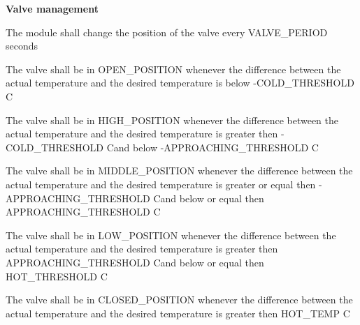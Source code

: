 \begin{req_enum}
	\item \textbf{Valve management}
	\begin{req_enum}[label*=\arabic*.]
		\item The module shall change the position of the valve every VALVE\_PERIOD seconds
		\begin{req_enum}[label*=\arabic*.]
			\item The valve shall be in OPEN\_POSITION whenever the difference between the actual temperature and the desired temperature is below -COLD\_THRESHOLD C\degree
			\item The valve shall be in HIGH\_POSITION whenever the difference between the actual temperature and the desired temperature is greater then -COLD\_THRESHOLD C\degree and below -APPROACHING\_THRESHOLD C\degree
			\item The valve shall be in MIDDLE\_POSITION whenever the difference between the actual temperature and the desired temperature is greater or equal then -APPROACHING\_THRESHOLD C\degree and below or equal then APPROACHING\_THRESHOLD C\degree
			\item The valve shall be in LOW\_POSITION whenever the difference between the actual temperature and the desired temperature is greater then APPROACHING\_THRESHOLD C\degree and below or equal then HOT\_THRESHOLD C\degree
			\item The valve shall be in CLOSED\_POSITION whenever the difference between the actual temperature and the desired temperature is greater then HOT\_TEMP C\degree
		\end{req_enum}
	\end{req_enum}


\end{req_enum}
